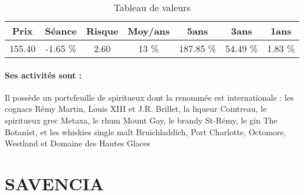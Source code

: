 \documentclass[11pt,a4paper]{report}%
\begin{document}
\begin{table}[H]
  \centering
    \begin{tabular}{|c|c|c|c|c|c|c|}
    \hline
    Prix & Séance & Risque  & Moy/ans & 5ans & 3ans & 1ans \\
    \hline
    155.40 &    -1.65 \%    & 2.60 & 13 \% & 187.85 \% & 54.49 \% & 1.83 \% \\
    \hline
    \end{tabular}%
        \label{tab:table_REMY COINTREAU}%
      \caption{Tableau de valeurs}
\end{table}%

\paragraph{Ses activités sont : }  Il possède un portefeuille de spiritueux dont la renommée est internationale : les cognacs Rémy Martin, Louis XIII et J.R. Brillet, la liqueur Cointreau, le spiritueux grec Metaxa, le rhum Mount Gay, le brandy St-Rémy, le gin The Botanist, et les whiskies single malt Bruichladdich, Port Charlotte, Octomore, Westland et Domaine des Hautes Glaces 
    
    \newpage

\section{SAVENCIA}
\end{document}
